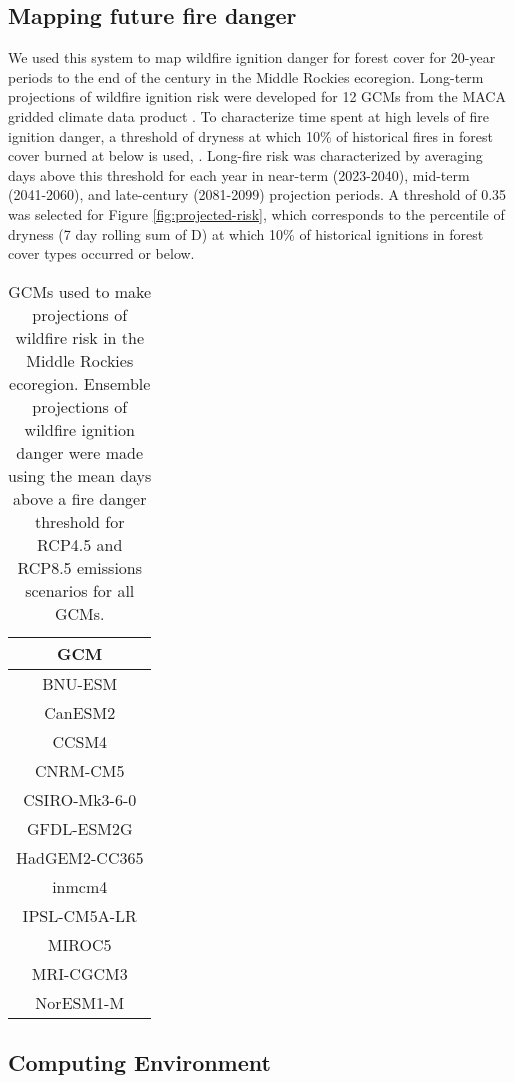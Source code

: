 \documentclass[11p]{article}
\begin{document}
\subsection{Mapping future fire danger}

We used this system to map wildfire ignition danger for forest cover for 20-year periods to the end of the century in the Middle Rockies ecoregion. Long-term projections of wildfire ignition risk were developed for 12 GCMs from the MACA gridded climate data product \citep{abatzoglouComparisonStatisticalDownscaling2012}. To characterize time spent at high levels of fire ignition danger, a threshold of dryness at which 10\% of historical fires in forest cover burned at below is used, .  Long-fire risk was characterized by averaging days above this threshold for each year in near-term (2023-2040), mid-term (2041-2060), and late-century (2081-2099) projection periods.  A threshold of 0.35 was selected for Figure \ref{fig:projected-risk}, which corresponds to the percentile of dryness (7 day rolling sum of D) at which 10\% of historical ignitions in forest cover types occurred or below.

\begin{table}[htbp]
  \centering
  \begin{tabular}{ c }
    \hline
    GCM \\
    \hline
    BNU-ESM \\
    CanESM2 \\
    CCSM4 \\
    CNRM-CM5 \\
    CSIRO-Mk3-6-0 \\
    GFDL-ESM2G \\
    HadGEM2-CC365 \\
    inmcm4 \\
    IPSL-CM5A-LR \\
    MIROC5 \\
    MRI-CGCM3 \\
    NorESM1-M \\
    \hline
  \end{tabular}
  \caption{GCMs used to make projections of wildfire risk in the Middle Rockies ecoregion.  Ensemble projections of wildfire ignition danger were made using the mean days above a fire danger threshold for RCP4.5 and RCP8.5 emissions scenarios for all GCMs.}
  \label{table:gcms}
\end{table}

\subsection{Computing Environment}
\end{document}
